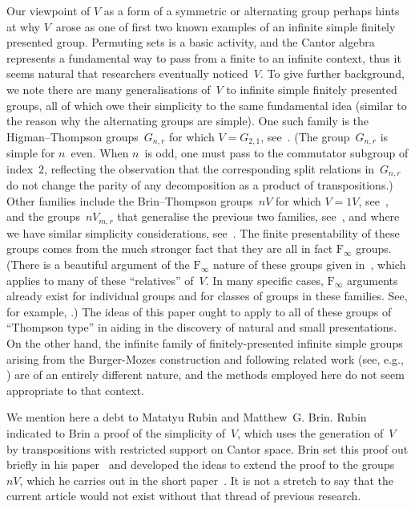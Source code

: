 \documentclass[a4paper,11pt]{article}
\numberwithin{equation}{section}
\begin{document}
Our viewpoint of $V$ as a form of a symmetric or alternating group
perhaps hints at why $V$~arose as one of first two known examples of
an infinite simple finitely presented group.  Permuting sets is a
basic activity, and the Cantor algebra represents a fundamental way to
pass from a finite to an infinite context, thus it seems natural that
researchers eventually noticed~$V$.  To give further background, we
note there are many generalisations of~$V$ to infinite simple finitely
presented groups, all of which owe their simplicity to the same
fundamental idea (similar to the reason why the alternating groups are
simple).  One such family is the Higman--Thompson groups~$G_{n,r}$ for
which $V = G_{2,1}$, see~\cite{Higman}.   (The group~$G_{n,r}$ is
simple for $n$~even.  When $n$~is odd, one must pass to the commutator
subgroup of index~$2$, reflecting the observation that the
corresponding split relations in~$G_{n,r}$ do not change the parity of
any decomposition as a product of transpositions.)  Other families
include the Brin--Thompson groups~$nV$ for which $V = 1V$,
see~\cite{Brin-higher}, and the groups~$nV_{m,r}$ that generalise the
previous two families, see~\cite{MPN}, and where we have similar
simplicity considerations, see~\cite{Brin-simplicity}.  The finite
presentability of these groups comes from the much stronger fact that
they are all in fact $\mathrm{F}_{\infty}$ groups.  (There is a
beautiful argument of the $\mathrm{F}_{\infty}$ nature of these groups
given in~\cite{Thumann}, which applies to many of these ``relatives''
of~$V$.  In many specific cases, $\mathrm{F}_{\infty}$ arguments
already exist for individual groups and for classes of groups in these
families.  See, for example, \cite{BelkForrest,Brown,BrownGeog,KMPN}.)
The ideas of this paper ought to apply to all of these groups of
``Thompson type'' in aiding in the discovery of natural and small
presentations.  On the other hand, the infinite family of
finitely-presented infinite simple groups arising from the
Burger-Mozes construction and following related work (see, e.g.,
\cite{BurgMozes97,BurgMozes01a,Rattaggi}) are of an entirely different
nature, and the methods employed here do not seem appropriate to that
context.

We mention here a debt to Matatyu Rubin and Matthew~G. Brin.  Rubin
indicated to Brin a proof of the simplicity of~$V$, which uses the
generation of~$V$ by transpositions with restricted support on Cantor
space.  Brin set this proof out briefly in his
paper~\cite{Brin-higher} and developed the ideas to extend the proof
to the groups $nV$, which he carries out in the short
paper~\cite{Brin-simplicity}.  It is not a stretch to say that the
current article would not exist without that thread of previous
research.
\end{document}
